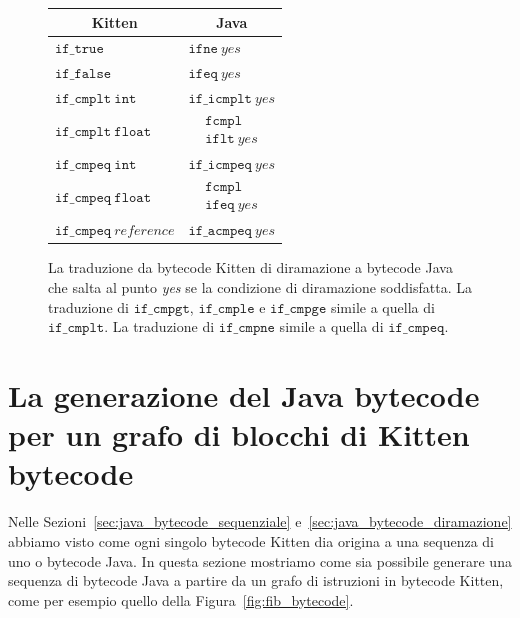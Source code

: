 \begin{figure}
\begin{center}
\begin{tabular}{l|l}
\multicolumn{1}{c}{Kitten} &
\multicolumn{1}{c}{Java} \\\hline\hline
$\mathtt{if\_true}$ & $\mathtt{ifne}\ \mathit{yes}$ \\\hline
$\mathtt{if\_false}$ & $\mathtt{ifeq}\ \mathit{yes}$ \\\hline
$\mathtt{if\_cmplt\ int}$ & $\mathtt{if\_icmplt}\ \mathit{yes}$ \\\hline
$\mathtt{if\_cmplt\ float}$ & $\begin{array}{rl}
                            & \mathtt{fcmpl} \\
                            & \mathtt{iflt}\ \mathit{yes}
                           \end{array}$\\\hline
$\mathtt{if\_cmpeq\ int}$ & $\mathtt{if\_icmpeq}\ \mathit{yes}$ \\\hline
$\mathtt{if\_cmpeq\ float}$ & $\begin{array}{rl}
                            & \mathtt{fcmpl} \\
                            & \mathtt{ifeq}\ \mathit{yes}
                           \end{array}$\\\hline
$\mathtt{if\_cmpeq}\ \mathit{reference}$ & $\mathtt{if\_acmpeq}\ \mathit{yes}$ \\\hline
\end{tabular}
\end{center}
\caption{La traduzione da bytecode Kitten di diramazione a bytecode Java che salta
al punto \textit{yes} se la condizione di diramazione \e soddisfatta.
La traduzione di $\mathtt{if\_cmpgt}$, $\mathtt{if\_cmple}$ e $\mathtt{if\_cmpge}$
\e simile a quella di $\mathtt{if\_cmplt}$. La traduzione di
$\mathtt{if\_cmpne}$ \e simile a quella di $\mathtt{if\_cmpeq}$.}
  \label{fig:kitten_into_java_condition}
\end{figure}

\section{La generazione del Java bytecode per un grafo di blocchi di Kitten bytecode}
  \label{sec:kitten_into_java_block}

Nelle Sezioni~\ref{sec:java_bytecode_sequenziale} e~\ref{sec:java_bytecode_diramazione}
abbiamo visto come ogni singolo bytecode Kitten dia origina a una sequenza di uno o
\piu bytecode Java. In questa sezione mostriamo come sia possibile generare una
sequenza di bytecode Java a partire da un grafo di istruzioni in bytecode Kitten,
come per esempio quello della Figura~\ref{fig:fib_bytecode}.


